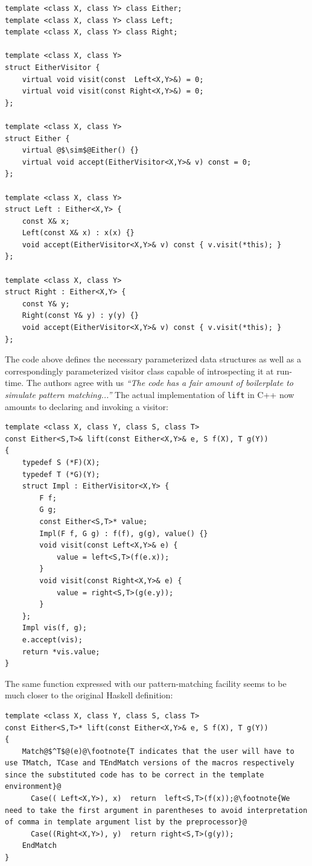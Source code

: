 \documentclass[preprint]{sigplanconf}
\DeclareRobustCommand{\codehaskell}[1]{{\lstinline[breaklines=false,language=Haskell]{#1}}}
\begin{document}
\begin{lstlisting}
template <class X, class Y> class Either;
template <class X, class Y> class Left;
template <class X, class Y> class Right;

template <class X, class Y>
struct EitherVisitor {
    virtual void visit(const  Left<X,Y>&) = 0;
    virtual void visit(const Right<X,Y>&) = 0;
};

template <class X, class Y>
struct Either {
    virtual @$\sim$@Either() {}
    virtual void accept(EitherVisitor<X,Y>& v) const = 0;
};

template <class X, class Y>
struct Left : Either<X,Y> {
    const X& x;
    Left(const X& x) : x(x) {}
    void accept(EitherVisitor<X,Y>& v) const { v.visit(*this); }
};

template <class X, class Y>
struct Right : Either<X,Y> {
    const Y& y;
    Right(const Y& y) : y(y) {}
    void accept(EitherVisitor<X,Y>& v) const { v.visit(*this); }
};
\end{lstlisting}

The code above defines the necessary parameterized data structures as well as a 
correspondingly parameterized visitor class capable of introspecting it at 
run-time. The authors agree with us \emph{``The code has a fair amount of 
boilerplate to simulate pattern matching...''} The actual implementation of 
\codehaskell{lift} in C++ now amounts to declaring and invoking a visitor:

\begin{lstlisting}
template <class X, class Y, class S, class T>
const Either<S,T>& lift(const Either<X,Y>& e, S f(X), T g(Y))
{
    typedef S (*F)(X);
    typedef T (*G)(Y);
    struct Impl : EitherVisitor<X,Y> {
        F f;
        G g;
        const Either<S,T>* value;
        Impl(F f, G g) : f(f), g(g), value() {}
        void visit(const Left<X,Y>& e) {
            value = left<S,T>(f(e.x));
        }
        void visit(const Right<X,Y>& e) {
            value = right<S,T>(g(e.y));
        }
    };
    Impl vis(f, g);
    e.accept(vis);
    return *vis.value;
}
\end{lstlisting}

The same function expressed with our pattern-matching facility seems to be much 
closer to the original Haskell definition:

\begin{lstlisting}[keepspaces,columns=flexible]
template <class X, class Y, class S, class T>
const Either<S,T>* lift(const Either<X,Y>& e, S f(X), T g(Y))
{
    Match@$^T$@(e)@\footnote{T indicates that the user will have to use TMatch, TCase and TEndMatch versions of the macros respectively since the substituted code has to be correct in the template environment}@
      Case(( Left<X,Y>), x)  return  left<S,T>(f(x));@\footnote{We need to take the first argument in parentheses to avoid interpretation of comma in template argument list by the preprocessor}@
      Case((Right<X,Y>), y)  return right<S,T>(g(y));
    EndMatch
}
\end{lstlisting}
\end{document}

